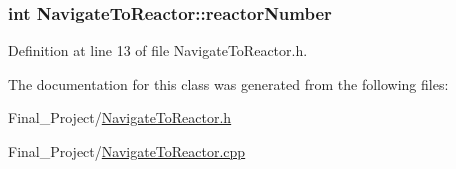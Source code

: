 \hypertarget{classNavigateToReactor_ac0bd289bd96de0e58d94735bc16b3d44}{
\subsubsection[{reactor\-Number}]{\setlength{\rightskip}{0pt plus 5cm}int Navigate\-To\-Reactor\-::reactor\-Number\hspace{0.3cm}{\ttfamily [private]}}}\label{classNavigateToReactor_ac0bd289bd96de0e58d94735bc16b3d44}


Definition at line 13 of file Navigate\-To\-Reactor.\-h.



The documentation for this class was generated from the following files\-:\begin{DoxyCompactItemize}
\item 
Final\-\_\-\-Project/\hyperlink{NavigateToReactor_8h}{Navigate\-To\-Reactor.\-h}\item 
Final\-\_\-\-Project/\hyperlink{NavigateToReactor_8cpp}{Navigate\-To\-Reactor.\-cpp}\end{DoxyCompactItemize}
